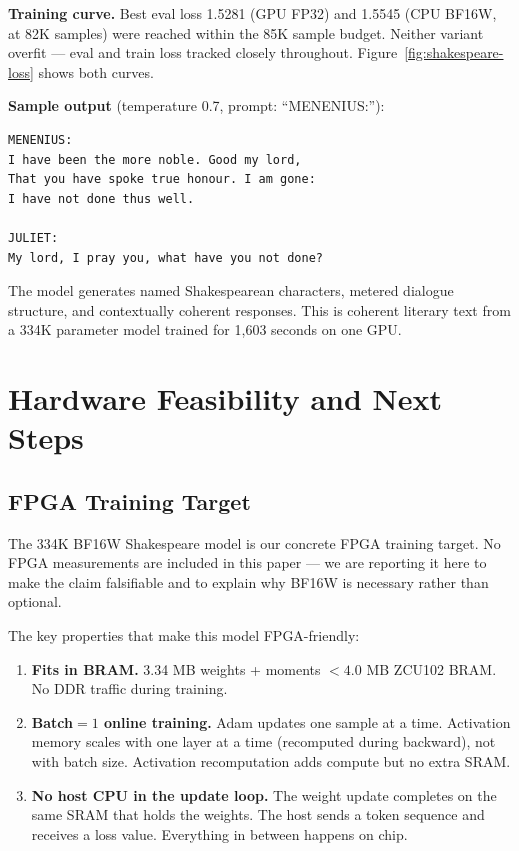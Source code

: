 \documentclass[11pt]{article}
\begin{document}
\textbf{Training curve.} Best eval loss 1.5281 (GPU FP32) and 1.5545 (CPU BF16W, at 82K samples)
were reached within the 85K sample budget. Neither variant overfit --- eval and train loss
tracked closely throughout. Figure~\ref{fig:shakespeare-loss} shows both curves.

\textbf{Sample output} (temperature 0.7, prompt: ``MENENIUS:''):
\begin{lstlisting}
MENENIUS:
I have been the more noble. Good my lord,
That you have spoke true honour. I am gone:
I have not done thus well.

JULIET:
My lord, I pray you, what have you not done?
\end{lstlisting}

The model generates named Shakespearean characters, metered dialogue structure, and
contextually coherent responses. This is coherent literary text from a 334K parameter
model trained for 1,603 seconds on one GPU.

\section{Hardware Feasibility and Next Steps}

\label{sec:future}

\subsection{FPGA Training Target}

The 334K BF16W Shakespeare model is our concrete FPGA training target. No FPGA
measurements are included in this paper --- we are reporting it here to make the
claim falsifiable and to explain why BF16W is necessary rather than optional.

The key properties that make this model FPGA-friendly:

\begin{enumerate}
  \item \textbf{Fits in BRAM.} 3.34 MB weights + moments $< 4.0$ MB ZCU102 BRAM.
    No DDR traffic during training.
  \item \textbf{Batch$=1$ online training.} Adam updates one sample at a time.
    Activation memory scales with one layer at a time (recomputed during backward),
    not with batch size. Activation recomputation adds compute but no extra SRAM.
  \item \textbf{No host CPU in the update loop.} The weight update completes on the
    same SRAM that holds the weights. The host sends a token sequence and receives
    a loss value. Everything in between happens on chip.
\end{enumerate}
\end{document}
